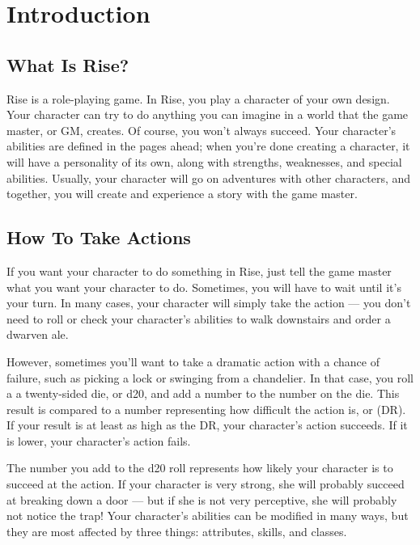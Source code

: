 \chapter{Introduction}

\section{What Is Rise?}
    Rise is a role-playing game.
    In Rise, you play a character of your own design.
    Your character can try to do anything you can imagine in a world that the game master, or GM, creates.
    Of course, you won't always succeed.
    Your character's abilities are defined in the pages ahead; when you're done creating a character, it will have a personality of its own, along with strengths, weaknesses, and special abilities.
    Usually, your character will go on adventures with other characters, and together, you will create and experience a story with the game master.

\section{How To Take Actions}

    If you want your character to do something in Rise, just tell the game master what you want your character to do.
    Sometimes, you will have to wait until it's your turn.
    In many cases, your character will simply take the action --- you don't need to roll or check your character's abilities to walk downstairs and order a dwarven ale.

    However, sometimes you'll want to take a dramatic action with a chance of failure, such as picking a lock or swinging from a chandelier.
    In that case, you roll a a twenty-sided die, or d20, and add a number to the number on the die.
    This result is compared to a number representing how difficult the action is, or  (DR).
    If your result is at least as high as the DR, your character's action succeeds.
    If it is lower, your character's action fails.

    The number you add to the d20 roll represents how likely your character is to succeed at the action.
    If your character is very strong, she will probably succeed at breaking down a door --- but if she is not very perceptive, she will probably not notice the trap! Your character's abilities can be modified in many ways, but they are most affected by three things: attributes, skills, and classes.

